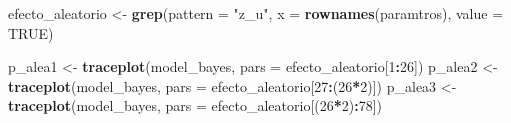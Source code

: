 \documentclass[
  12pt,
]{book}
\newenvironment{Shaded}{\begin{snugshade}}{\end{snugshade}}
\newcommand{\AttributeTok}[1]{\textcolor[rgb]{0.13,0.29,0.53}{#1}}
\newcommand{\ConstantTok}[1]{\textcolor[rgb]{0.56,0.35,0.01}{#1}}
\newcommand{\DecValTok}[1]{\textcolor[rgb]{0.00,0.00,0.81}{#1}}
\newcommand{\FunctionTok}[1]{\textcolor[rgb]{0.13,0.29,0.53}{\textbf{#1}}}
\newcommand{\NormalTok}[1]{#1}
\newcommand{\OtherTok}[1]{\textcolor[rgb]{0.56,0.35,0.01}{#1}}
\newcommand{\SpecialCharTok}[1]{\textcolor[rgb]{0.81,0.36,0.00}{\textbf{#1}}}
\newcommand{\StringTok}[1]{\textcolor[rgb]{0.31,0.60,0.02}{#1}}
\begin{document}
\begin{Shaded}
\begin{Highlighting}[]
\NormalTok{efecto\_aleatorio }\OtherTok{\textless{}{-}}  \FunctionTok{grep}\NormalTok{(}\AttributeTok{pattern =} \StringTok{"z\_u"}\NormalTok{, }
                          \AttributeTok{x =} \FunctionTok{rownames}\NormalTok{(paramtros),}
                          \AttributeTok{value =} \ConstantTok{TRUE}\NormalTok{)}

\NormalTok{p\_alea1 }\OtherTok{\textless{}{-}} \FunctionTok{traceplot}\NormalTok{(model\_bayes, }\AttributeTok{pars =}\NormalTok{ efecto\_aleatorio[}\DecValTok{1}\SpecialCharTok{:}\DecValTok{26}\NormalTok{])}
\NormalTok{p\_alea2 }\OtherTok{\textless{}{-}} \FunctionTok{traceplot}\NormalTok{(model\_bayes, }\AttributeTok{pars =}\NormalTok{ efecto\_aleatorio[}\DecValTok{27}\SpecialCharTok{:}\NormalTok{(}\DecValTok{26}\SpecialCharTok{*}\DecValTok{2}\NormalTok{)])}
\NormalTok{p\_alea3 }\OtherTok{\textless{}{-}} \FunctionTok{traceplot}\NormalTok{(model\_bayes, }\AttributeTok{pars =}\NormalTok{ efecto\_aleatorio[(}\DecValTok{26}\SpecialCharTok{*}\DecValTok{2}\NormalTok{)}\SpecialCharTok{:}\DecValTok{78}\NormalTok{])}
\end{Highlighting}
\end{Shaded}
\end{document}
